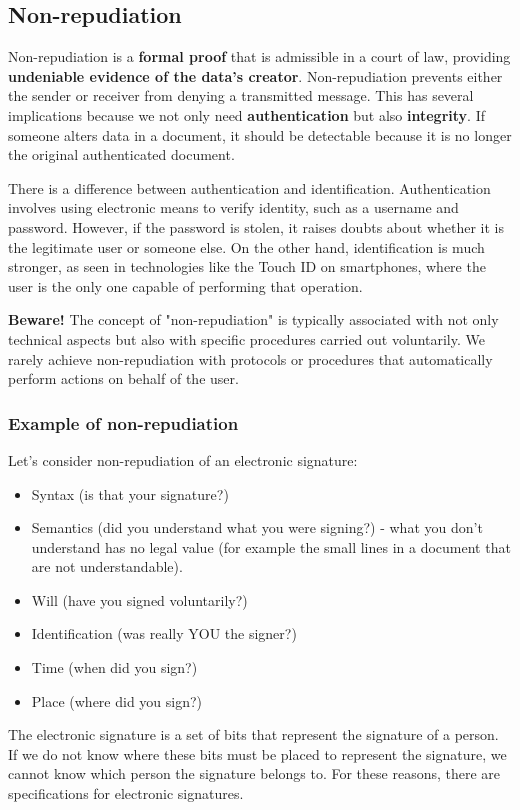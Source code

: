 \subsection{Non-repudiation}
Non-repudiation is a \textbf{formal proof} that is admissible in a court of law, providing \textbf{undeniable evidence of the data's creator}. Non-repudiation prevents either the sender or receiver from denying a transmitted message. This has several implications because we not only need \textbf{authentication} but also \textbf{integrity}. If someone alters data in a document, it should be detectable because it is no longer the original authenticated document.

There is a difference between authentication and identification. Authentication involves using electronic means to verify identity, such as a username and password. However, if the password is stolen, it raises doubts about whether it is the legitimate user or someone else. On the other hand, identification is much stronger, as seen in technologies like the Touch ID on smartphones, where the user is the only one capable of performing that operation.

\textbf{Beware!} The concept of "non-repudiation" is typically associated with not only technical aspects but also with specific procedures carried out voluntarily. We rarely achieve non-repudiation with protocols or procedures that automatically perform actions on behalf of the user.

\subsubsection{Example of non-repudiation}
Let's consider non-repudiation of an electronic signature:
\begin{itemize}
  \item Syntax (is that your signature?)
  \item Semantics (did you understand what you were signing?) - what you don't understand has no legal value (for example the small lines in a document that are not understandable).
  \item Will (have you signed voluntarily?)
  \item Identification (was really YOU the signer?)
  \item Time (when did you sign?)
  \item Place (where did you sign?)
\end{itemize}
The electronic signature is a set of bits that represent the signature of a person. If we do not know where these bits must be placed to represent the signature, we cannot know which person the signature belongs to. For these reasons, there are specifications for electronic signatures.



